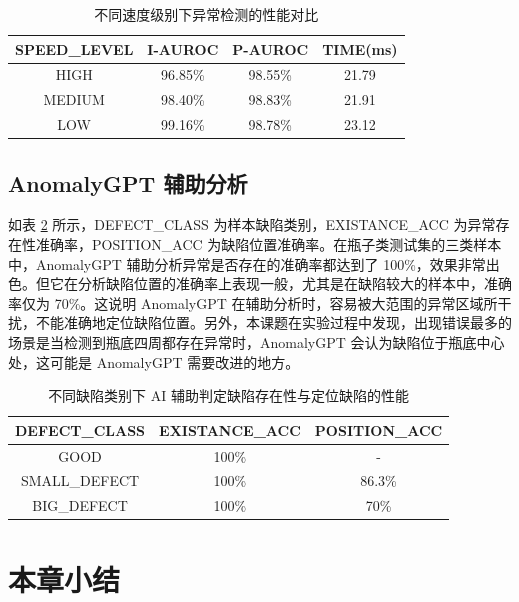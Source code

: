 \documentclass[
  ]{njuthesis}
\begin{document}
\begin{table}[H]
    \centering
    \caption{不同速度级别下异常检测的性能对比}
    \label{speed_level_comparison}
    \renewcommand\arraystretch{0.8}
    \begin{tabular}{cccc}
    \toprule
    SPEED\_LEVEL & I-AUROC & P-AUROC & TIME(ms) \\
    \midrule
    HIGH & 96.85\% & 98.55\% & 21.79 \\
    MEDIUM & 98.40\% & 98.83\% & 21.91 \\
    LOW & 99.16\% & 98.78\% & 23.12 \\
    \bottomrule
    \end{tabular}
\end{table}

\subsection{AnomalyGPT 辅助分析}

如表 \ref{AI_detection_accuracy} 所示，DEFECT\_CLASS 为样本缺陷类别，EXISTANCE\_ACC 为异常存在性准确率，POSITION\_ACC 为缺陷位置准确率。在瓶子类测试集的三类样本中，AnomalyGPT 辅助分析异常是否存在的准确率都达到了 100\%，效果非常出色。但它在分析缺陷位置的准确率上表现一般，尤其是在缺陷较大的样本中，准确率仅为 70\%。这说明 AnomalyGPT 在辅助分析时，容易被大范围的异常区域所干扰，不能准确地定位缺陷位置。另外，本课题在实验过程中发现，出现错误最多的场景是当检测到瓶底四周都存在异常时，AnomalyGPT 会认为缺陷位于瓶底中心处，这可能是 AnomalyGPT 需要改进的地方。

\begin{table}[H]
    \centering
    \caption{不同缺陷类别下 AI 辅助判定缺陷存在性与定位缺陷的性能}
    \label{AI_detection_accuracy}
    \renewcommand\arraystretch{0.8}
    \begin{tabular}{ccc}
    \toprule
    DEFECT\_CLASS & EXISTANCE\_ACC & POSITION\_ACC \\
    \midrule
    GOOD & 100\% & - \\
    SMALL\_DEFECT & 100\% & 86.3\% \\
    BIG\_DEFECT & 100\% & 70\% \\
    \bottomrule
    \end{tabular}
\end{table}

\section{本章小结}
\end{document}
